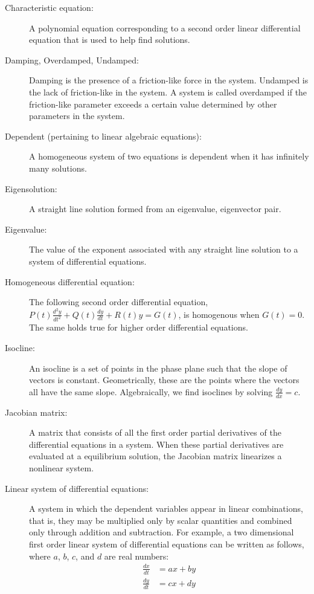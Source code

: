 \begin{description}
\item[Characteristic equation:] A polynomial equation corresponding to a second order linear differential equation that is used to help find solutions.  
\item[Damping, Overdamped, Undamped:] Damping is the presence of a friction-like force in the system. Undamped is the lack of friction-like in the system. A system is called overdamped if the friction-like parameter exceeds a certain value determined by other parameters in the system.  
\item[Dependent (pertaining to linear algebraic equations):] A homogeneous system of two equations is dependent when it has infinitely many solutions.
\item[Eigensolution:] A straight line solution formed from an eigenvalue, eigenvector pair.
\item[Eigenvalue:] The value of the exponent associated with any straight line solution to a system of differential equations.
\item[Homogeneous differential equation:] The following second order differential equation, $P(t)\frac{d^2y}{dt^2}+Q(t)\frac{dy}{dt}+R(t)y=G(t)$, is homogenous when $G(t)=0$. The same holds true for higher order differential equations.
\item[Isocline:] An isocline is a set of points in the phase plane such that the slope of vectors is constant. Geometrically, these are the points where the vectors all have the same slope. Algebraically, we find isoclines by solving $\frac{dy}{dx} = c$. 
\item[Jacobian matrix:] A matrix that consists of all the first order partial derivatives of the differential equations in a system. When these partial derivatives are evaluated at a equilibrium solution, the Jacobian matrix linearizes a nonlinear system. 
\item[Linear system of differential equations:] A system in which the dependent variables appear in linear combinations, that is, they may be multiplied only by scalar quantities and combined only through addition and subtraction. For example, a two dimensional first order linear system of differential equations can be written as follows, where $a$, $b$, $c$, and $d$ are real numbers:
\begin{align*}
\frac{dx}{dt} &= ax + by \\
\frac{dy}{dt} &= cx + dy
\end{align*}

\end{description}
